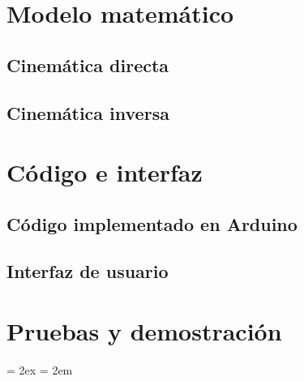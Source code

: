 \documentclass[11pt]{article}
\begin{document}

\section{Modelo matemático}
\label{sec:modelo}


\subsection{Cinemática directa}

\subsection{Cinemática inversa}



\section{Código e interfaz}
\label{sec:código}



\subsection{Código implementado en Arduino}


\subsection{Interfaz de usuario}


\section{Pruebas y demostración}
\label{sec:pruebas}


\bibitemsep = 2ex
\bibhang = 2em


\end{document}
